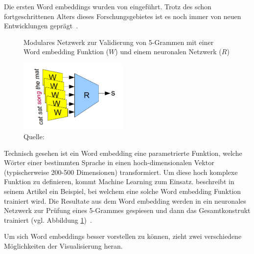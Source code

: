 Die ersten Word embeddings wurden von \textcite{Bengio2001} eingeführt. Trotz des schon fortgeschrittenen Alters dieses Forschungsgebietes ist es noch immer von neuen Entwicklungen geprägt~\autocite{Olah2014b}.

\begin{figure} 
    \captionsetup{width=.9\linewidth}
    \caption[Modulares Netzwerk zur Validierung von 5-Grammen]{Modulares Netzwerk zur Validierung von 5-Grammen mit einer Word embedding Funktion ($W$) und einem neuronalen Netzwerk ($R$)}
    \label{wordembeddingtraining}
    \centering
    \includegraphics[width=0.48\textwidth]{graphics/wordembeddingtraining.png}
    \caption*{Quelle: \textcite{Olah2014b}}
\end{figure}
Technisch gesehen ist ein Word embedding eine parametrierte Funktion, welche Wörter einer bestimmten Sprache in einen hoch-dimensionalen Vektor (typischerweise 200-500 Dimensionen) transformiert. Um diese hoch komplexe Funktion zu definieren, kommt Machine Learning zum Einsatz. \textcite{Olah2014b} beschreibt in seinem Artikel ein Beispiel, bei welchem eine solche Word embedding Funktion trainiert wird. Die Resultate aus dem Word embedding werden in ein neuronales Netzwerk zur Prüfung eines 5-Grammes gespiesen und dann das Gesamtkonstrukt trainiert (vgl. Abbildung \ref{wordembeddingtraining})~\autocite{Olah2014b}.

Um sich Word embeddings besser vorstellen zu können, zieht \textcite{Olah2014b} zwei verschiedene Möglichkeiten der Visualisierung heran.

